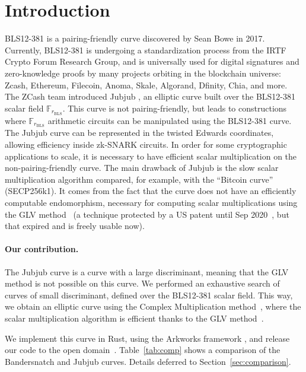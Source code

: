 \documentclass[version=preprint]{iacrcc}
\begin{document}
\section{Introduction}
BLS12-381 is a pairing-friendly curve discovered by Sean
Bowe \cite{bls12381} in 2017.
Currently, BLS12-381 is undergoing a standardization process 
from the
IRTF Crypto Forum Research Group, and is
universally used for digital
signatures and zero-knowledge proofs by many projects orbiting in the
blockchain universe: Zcash, Ethereum, Filecoin, Anoma, Skale, Algorand, Dfinity,
Chia, and more.
The ZCash team
introduced Jubjub \cite{jubjub}, an
elliptic curve built over the BLS12-381 scalar field $\mathbb
F_{r_\text{BLS}}$.
This curve is not pairing-friendly, but leads to constructions where
$\mathbb F_{r_\text{BLS}}$ arithmetic circuits can be manipulated
using the BLS12-381 curve.
The Jubjub curve can be represented in the twisted Edwards
coordinates, allowing efficiency inside zk-SNARK circuits.
In order for some cryptographic applications to scale, it is necessary to
have efficient scalar multiplication on the non-pairing-friendly
curve.
The main drawback of Jubjub is the slow scalar multiplication
algorithm compared, for example, with the ``Bitcoin curve''
(SECP256k1).
It comes from the fact that the curve does not have an efficiently
computable endomorphism, necessary for computing scalar
multiplications using the GLV method~\cite{C:GalLamVan01} (a technique
protected by a US patent until Sep 2020~\cite{glvpatent}, but that 
expired and is
freely usable now).

\paragraph{Our contribution.}
The Jubjub curve is a curve with a large discriminant, meaning that
the GLV method is not possible on this curve.
We performed an exhaustive search of curves of small discriminant,
defined over the BLS12-381 scalar field. This way, we obtain an
elliptic curve using the Complex Multiplication
method~\cite{MC:AtkMor93}, where the scalar multiplication algorithm
is efficient thanks to the GLV method~\cite{C:GalLamVan01}.

We implement this curve in Rust, using
the {Arkworks framework} \cite{arkworks}, and release our
code to the open domain~\cite{bandersnatch-rust}.
Table~\ref{tab:comp} shows a comparison of the Bandersnatch and Jubjub curves.
Details deferred to Section~\ref{sec:comparison}.
\end{document}
